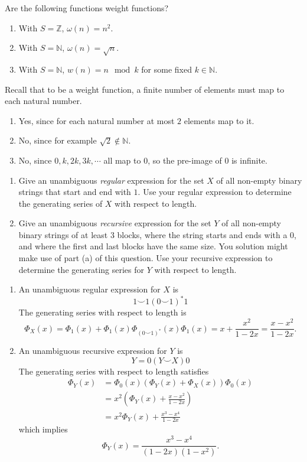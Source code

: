 \begin{enumerate}
     Are the following functions weight functions?
    \begin{enumerate}
        \item With $S = \mathbb{Z}$, $\omega(n) = n^2$.
        \item With $S = \mathbb{N}$, $\omega(n) = \sqrt{n}$.
        \item With $S = \mathbb{N}$, $w(n) = n \mod k$ for some fixed $k \in \mathbb{N}$.
    \end{enumerate}
    \answer Recall that to be a weight function, a finite number of elements must map to each natural number.
    \begin{enumerate}
        \item Yes, since for each natural number at most $2$ elements map to it.
        \item No, since for example $\sqrt{2} \not\in \mathbb{N}$.
        \item No, since $0 , k , 2k , 3k , \cdots$ all map to $0$, so the pre-image of $0$ is infinite.
    \end{enumerate}

    \newpage
      \begin{enumerate}
        \item Give an unambiguous \textit{regular} expression for the set $X$ of all non-empty binary strings that start and end with $1$. Use your regular expression to determine the generating series of $X$ with respect to length.
        \item Give an unambiguous \textit{recursive} expression for the set $Y$ of all non-empty binary strings of at least $3$ blocks, where the string starts and ends with a $0$, and where the first and last blocks have the same size. You solution might make use of part (a) of this question. Use your recursive expression to determine the generating series for $Y$ with respect to length.
    \end{enumerate}
    \answer 

    \begin{enumerate}
        \item An unambiguous regular expression for $X$ is
    \[1 \smile 1 (0 \smile 1)^* 1\]
    The generating series with respect to length is 
    \[\Phi_X(x) = \Phi_1(x) + \Phi_1(x)\Phi_{(0 \smile 1)^*}(x) \Phi_1(x) = x + \frac{x^2}{1-2x} = \frac{x-x^2}{1-2x}.\]
    \item An unambiguous recursive expression for $Y$ is 
    \[Y = 0 (Y \smile X) 0\]
    The generating series with respect to length satisfies 
    \begin{align*}
        \Phi_Y(x) &= \Phi_0(x) (\Phi_Y(x) + \Phi_X(x)) \Phi_0(x) \\
        &= x^2\left(\Phi_Y(x) + \frac{x-x^2}{1-2x}\right) \\
        &= x^2\Phi_Y(x) + \frac{x^3-x^4}{1-2x}
    \end{align*}
    which implies
    \[\Phi_Y(x) = \frac{x^3 - x^4}{(1-2x)(1-x^2)}.\]
    \end{enumerate}


\end{enumerate}
